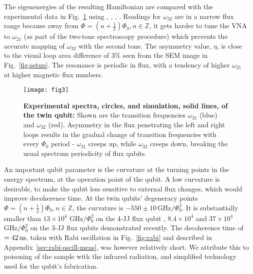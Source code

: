 The eigenenergies  of the  resulting Hamiltonian  are compared with  the experimental  data in
Fig.~\ref{fig:experiment} using ,  , , .   Readings for $ \omega_{32} $ are in a  narrow flux range because
away from  $ \Phi  = (n +  \frac{1}{2})\Phi_0, n\in\mathbb{Z}  $, it  gets harder to  tune the  VNA to
$  \omega_{21} $  (as part  of the  two-tone spectroscopy  procedure) which  prevents the  accurate
mapping of $ \omega_{32} $ with the second tone. The asymmetry value, $ \eta $, is close to the visual
loop area difference of 3\% seen from the SEM image in Fig.~\ref{fig:setup}.  The resonance is
periodic in flux, with a tendency of higher $\omega_{21}$ at higher magnetic flux numbers.

\begin{figure}[h]
  \texttt{[image: fig3]}
  \caption{\small \textbf{Experimental spectra,  circles, and simulation, solid  lines, of the
      twin   qubit:}  Shown   are  the   transition  frequencies   $  \omega_{21}   $  (blue)   and
    $ \omega_{32}$ (red). Asymmetry in the flux penetrating the left and right loops results in the
    gradual change of transition frequencies with every $ \Phi_{0} $ period - $\omega_{21}$ creeps up,
    while   $\omega_{32}$  creeps   down,  breaking   the  usual   spectrum  periodicity   of  flux
    qubits.  \label{fig:experiment}}
\end{figure}
 
An important qubit parameter is the curvature at the turning points in the energy spectrum, at
the operation  point of  the qubit.   A low  curvature is  desirable, to  make the  qubit less
sensitive to external flux changes, which would improve decoherence time.  At the twin qubits'
degeneracy  points   $  \Phi  =   (n  +  \frac{1}{2})\Phi_0,   n\in\mathbb{Z}  $,  the   curvature  is
$   -550\pm10\,\text{GHz}/\Phi_0^2  $.    It  is   substantially   smaller  than   $  13\times   10^4$
$ \text{GHz}/\Phi_0^2$ on the 4-JJ flux qubit  \cite{stern2014}, $ 8.4 \times 10^4$ \cite{zhu2010} and
$ 37\times 10^{4}$  $ \text{GHz}/\Phi_0^2$ \cite{gustavsson2012} on the 3-JJ  flux qubits demonstrated
recently.   The decoherence  time of  $ =  42\,\text{ns} $,  taken with  Rabi oscillation  in
Fig.~\ref{fig:rabi}   and  described   in  Appendix~\ref{sec:rabi-oscill-meas},   was  however
relatively short.  We attribute  this to poisoning of the sample  with the infrared radiation,
and simplified technology used for the qubit's fabrication.

